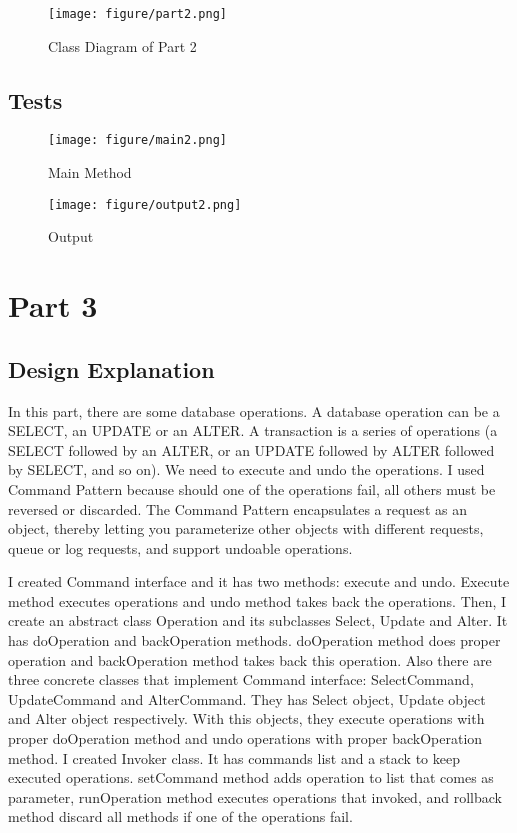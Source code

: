 \documentclass[twoside,11pt]{article}
\begin{document}
\begin{figure}[h]
\caption{Class Diagram of Part 2}
\centering
\texttt{[image: figure/part2.png]}
\end{figure}

\subsection{Tests}

\begin{figure}[h]
\caption{Main Method}
\centering
\texttt{[image: figure/main2.png]}
\end{figure}

\newpage

\begin{figure}[h]
\caption{Output}
\centering
\texttt{[image: figure/output2.png]}
\end{figure}

\section{Part 3} 
\label{sec:background}

\subsection{Design Explanation}

In this part, there are some database operations. A database operation can be a SELECT, an UPDATE or an ALTER. A transaction is a series of operations (a SELECT followed by an ALTER, or an UPDATE followed by ALTER followed by SELECT, and so on). We need to execute and undo the operations. I used Command Pattern because should one of the operations fail, all others must be reversed or discarded. The Command Pattern encapsulates a request as an object, thereby letting you parameterize other objects with different requests, queue or log requests, and support undoable operations. \newline

I created Command interface and it has two methods: execute and undo. Execute method executes operations and undo method takes back the operations. Then, I create an abstract class Operation and its subclasses Select, Update and Alter. It has doOperation and backOperation methods. doOperation method does proper operation and backOperation method takes back this operation. Also there are three concrete classes that implement Command interface: SelectCommand, UpdateCommand and AlterCommand. They has Select object, Update object and Alter object respectively. With this objects, they execute operations with proper doOperation method and undo operations with proper backOperation method. I created Invoker class. It has commands list and a stack to keep executed operations. setCommand method adds operation to list that comes as parameter, runOperation method executes operations that invoked, and rollback method discard all methods if one of the operations fail.\newline
\end{document}
